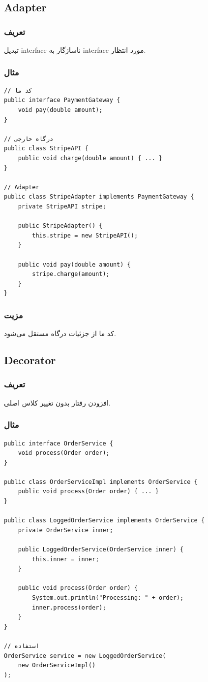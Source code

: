 \documentclass[12pt, a4paper]{article}
\begin{document}
\subsection{Adapter}

\subsubsection{تعریف}
تبدیل interface ناسازگار به interface مورد انتظار.

\subsubsection{مثال}
\begin{lstlisting}
// کد ما
public interface PaymentGateway {
    void pay(double amount);
}

// درگاه خارجی
public class StripeAPI {
    public void charge(double amount) { ... }
}

// Adapter
public class StripeAdapter implements PaymentGateway {
    private StripeAPI stripe;
    
    public StripeAdapter() {
        this.stripe = new StripeAPI();
    }
    
    public void pay(double amount) {
        stripe.charge(amount);
    }
}
\end{lstlisting}

\subsubsection{مزیت}
کد ما از جزئیات درگاه مستقل می‌شود.

\subsection{Decorator}

\subsubsection{تعریف}
افزودن رفتار بدون تغییر کلاس اصلی.

\subsubsection{مثال}
\begin{lstlisting}
public interface OrderService {
    void process(Order order);
}

public class OrderServiceImpl implements OrderService {
    public void process(Order order) { ... }
}

public class LoggedOrderService implements OrderService {
    private OrderService inner;
    
    public LoggedOrderService(OrderService inner) {
        this.inner = inner;
    }
    
    public void process(Order order) {
        System.out.println("Processing: " + order);
        inner.process(order);
    }
}

// استفاده
OrderService service = new LoggedOrderService(
    new OrderServiceImpl()
);
\end{lstlisting}
\end{document}
